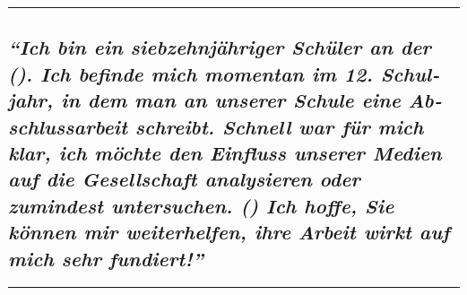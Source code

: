 \begin{center}\rule{0.5\linewidth}{\linethickness}\end{center}

\hypertarget{ich-bin-ein-siebzehnjuxe4hriger-schuxfcler-an-der--ich-befinde-mich-momentan-im-12-schuljahr-in-dem-man-an-unserer-schule-eine-abschlussarbeit-schreibt-schnell-war-fuxfcr-mich-klar-ich-muxf6chte-den-einfluss-unserer-medien-auf-die-gesellschaft-analysieren-oder-zumindest-untersuchen--ich-hoffe-sie-kuxf6nnen-mir-weiterhelfen-ihre-arbeit-wirkt-auf-mich-sehr-fundiert}{%
\subsection{\texorpdfstring{\emph{``Ich bin ein sieb­zehn­jähriger
Schüler an der (). Ich befinde mich momentan im 12. Schul­jahr, in dem
man an unserer Schule eine Ab­schluss­arbeit schreibt. Schnell war für
mich klar, ich möchte den Einfluss unserer Medien auf die Gesellschaft
analysieren oder zumindest untersuchen. () Ich hoffe, Sie können mir
weiterhelfen, ihre Arbeit wirkt auf mich sehr
fundiert!''}}{``Ich bin ein sieb­zehn­jähriger Schüler an der (). Ich befinde mich momentan im 12. Schul­jahr, in dem man an unserer Schule eine Ab­schluss­arbeit schreibt. Schnell war für mich klar, ich möchte den Einfluss unserer Medien auf die Gesellschaft analysieren oder zumindest untersuchen. () Ich hoffe, Sie können mir weiterhelfen, ihre Arbeit wirkt auf mich sehr fundiert!''}}\label{ich-bin-ein-siebzehnjuxe4hriger-schuxfcler-an-der--ich-befinde-mich-momentan-im-12-schuljahr-in-dem-man-an-unserer-schule-eine-abschlussarbeit-schreibt-schnell-war-fuxfcr-mich-klar-ich-muxf6chte-den-einfluss-unserer-medien-auf-die-gesellschaft-analysieren-oder-zumindest-untersuchen--ich-hoffe-sie-kuxf6nnen-mir-weiterhelfen-ihre-arbeit-wirkt-auf-mich-sehr-fundiert}}

\begin{center}\rule{0.5\linewidth}{\linethickness}\end{center}

